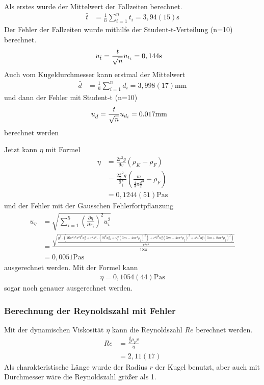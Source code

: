 \documentclass[11pt, a4paper]{article}
\begin{document}
    Als erstes wurde der Mittelwert der Fallzeiten berechnet.
    \begin{align}
        \bar{t} &= \frac{1}{n} \sum_{i=1}^{n} t_i = 3,94(15) \si{\second}
    \end{align}
    Der Fehler der Fallzeiten wurde mithilfe der Student-t-Verteilung (n=10) berechnet.
    \begin{align}
        u_{\bar{t}} &= \frac{{\it t}}{\sqrt{n}} u_{t_i} =  0,144 \si{\second}
    \end{align}
    Auch vom Kugeldurchmesser kann erstmal der Mittelwert
    \begin{align}
        \bar{d} &= \frac{1}{n} \sum_{i=1}^{n} d_i = 3,998(17) \si{\milli\metre}
    \end{align}
    und dann der Fehler mit Student-t (n=10)
    \begin{align}
        u_{\bar{d}} &= \frac{{\it t}}{\sqrt{n}} u_{d_i} = 0.017 \si{\milli\metre}
    \end{align}
    berechnet werden

    Jetzt kann $\eta$ mit Formel \cite[(11)]{VIS}
    \begin{align}
        \eta &= \frac{2r^2g}{9v}(\rho_K - \rho_F)  \nonumber \\
        &= \frac{2\frac{d}{2}^2g}{9\frac{s}{\bar{t}}}(\frac{m}{\frac{4}{3} \pi \frac{d}{2}^3} - \rho_F) \nonumber \\
        &= 0,1244(51) \si{\pascal\second}
    \end{align}
    und der Fehler mit der Gausschen Fehlerfortpflanzung \cite{ABW}
    \begin{align}
        u_{\eta} &= \sqrt{\sum^5_{i = 1}\left(\frac{\partial \eta}{\partial x_i}\right)^2 u_i^2} \\
        &= \frac{\sqrt{\frac{g^{2} \cdot \left(16 \pi^{2} r^{8} s^{2} t^{2} u_{\rho}^{2} + r^{2} s^{2} \cdot \left(9 t^{2} u_{m}^{2} + u_{t}^{2} \left(3 m - 4 \pi r^{3} \rho_{f}\right)^{2}\right) + r^{2} t^{2} u_{s}^{2} \left(3 m - 4 \pi r^{3} \rho_{f}\right)^{2} + s^{2} t^{2} u_{r}^{2} \left(3 m + 8 \pi r^{3} \rho_{f}\right)^{2}\right)}{r^{4} s^{4}}}}{18 \pi} \\
        &= 0,0051 \si{\pascal\second}
    \end{align}
    ausgerechnet werden.
    Mit der Formel \cite[(12)]{VIS} kann
    \begin{align}
        \eta = 0,1054(44) \si{\pascal\second}
    \end{align}
    sogar noch genauer ausgerechnet werden.
    \subsubsection{Berechnung der Reynoldszahl mit Fehler} \label{sec:reynolds}
    Mit der dynamischen Viskosität $\eta$ kann die Reynoldszahl $Re$ berechnet werden.
    \begin{align}
        Re &= \frac{\frac{d}{2} \rho_F v}{\eta} \nonumber \\
            &= 2,11(17)
    \end{align}
    Als charakteristische Länge wurde der Radius $r$ der Kugel benutzt, aber auch mit Durchmesser
    wäre die Reynoldszahl größer als 1.
\end{document}
